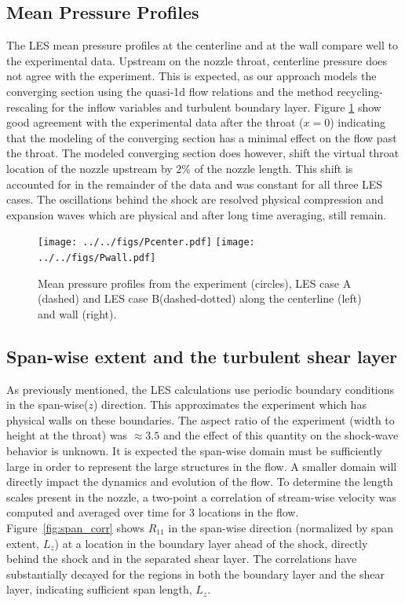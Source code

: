 \documentclass[]{aiaa-tc}%
\begin{document}
\subsection{Mean Pressure Profiles}
The LES mean pressure profiles at the centerline and at the wall compare well to the experimental data.  Upstream on the nozzle throat, centerline pressure does not agree with the experiment.  This is expected, as our approach models the converging section using the quasi-1d flow relations and the method recycling-rescaling for the inflow variables and turbulent boundary layer.  Figure \ref{fig:P_prof} show good agreement with the experimental data after the throat ($x=0$) indicating that the modeling of the converging section has a minimal effect on the flow past the throat.  The modeled converging section does however, shift the virtual throat location of the nozzle upstream by 2\% of the nozzle length.  This shift is accounted for in the remainder of the data and was constant for all three LES cases.  The oscillations behind the shock are resolved physical compression and expansion waves which are physical and after long time averaging, still remain.

\begin{figure}[!ht]
	\texttt{[image: ../../figs/Pcenter.pdf]}
	\texttt{[image: ../../figs/Pwall.pdf]}
	\caption{ Mean pressure profiles from the experiment (circles),  LES case A (dashed) and LES case B(dashed-dotted) along the centerline (left) and wall (right). 
	\label{fig:P_prof}
	}
\end{figure}


\subsection{Span-wise extent and the turbulent shear layer }
As previously mentioned, the LES calculations use periodic boundary conditions in the span-wise($z$) direction.  This approximates the experiment which has physical walls on these boundaries.  The aspect ratio of the experiment (width to height at the throat) was $\approx 3.5$ and the effect of this quantity on the shock-wave behavior is unknown.  It is expected the span-wise domain must be sufficiently large in order to represent the large structures in the flow.  A smaller domain will directly impact the dynamics and evolution of the flow.  To determine the length scales present in the nozzle, a two-point a correlation of stream-wise velocity was computed and averaged over time for 3 locations in the flow.  Figure~\ref{fig:span_corr} shows $R_{11}$ in the span-wise direction (normalized by span extent, $L_z$) at a location in the boundary layer ahead of the shock, directly behind the shock and in the separated shear layer.  The correlations have substantially decayed for the regions in both the boundary layer and the shear layer, indicating sufficient span length, $L_z$.
\end{document}
